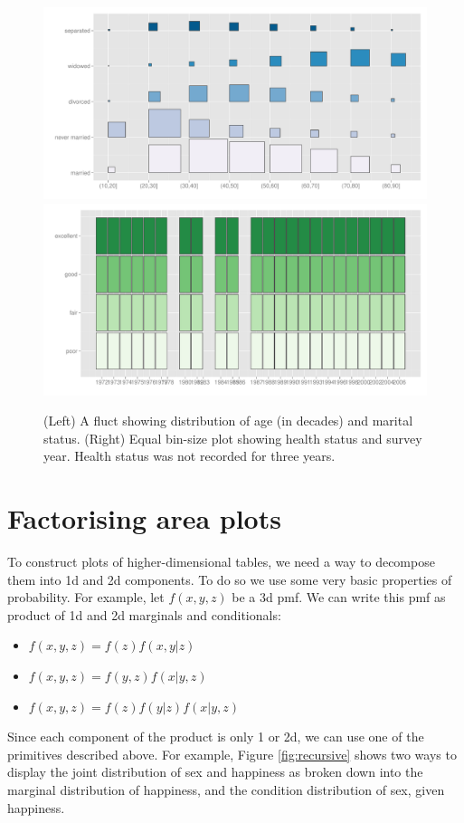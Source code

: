 \documentclass[letterpaper,oneside]{scrartcl}
\begin{document}
\begin{figure}[htbp]
  \centering
    \includegraphics[width=0.5\linewidth]{part-fluct}%
    \includegraphics[width=0.5\linewidth]{part-fluct-cond}
  \caption{(Left) A fluct showing distribution of age (in decades) and marital status. (Right) Equal bin-size plot showing health status and survey year. Health status was not recorded for three years.}
  \label{fig:fluct}
\end{figure}

\section{Factorising area plots}
\label{sec:combination}

To construct plots of higher-dimensional tables, we need a way to decompose them into 1d and 2d components. To do so we use some very basic properties of probability. For example, let $f(x, y, z)$ be a 3d pmf. We can write this pmf as product of 1d and 2d marginals and conditionals:

\begin{itemize}
  \item $f(x, y, z) = f(z) f(x, y | z)$
  \item $f(x, y, z) = f(y, z) f(x | y, z) $
  \item $f(x, y, z) = f(z) f(y | z) f(x | y, z)$
\end{itemize}

\noindent Since each component of the product is only 1 or 2d, we can use one of the primitives described above. For example, Figure \ref{fig:recursive} shows two ways to display the joint distribution of sex and happiness as broken down into the marginal distribution of happiness, and the condition distribution of sex, given happiness.
\end{document}
